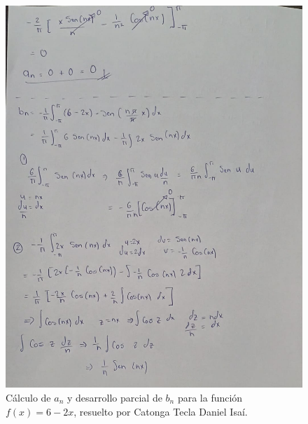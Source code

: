 {\begin{figure}[H]
    \centering
    \includegraphics[width=\linewidth]{Figures/fourierDaniel/fourierDaniel3.jpg}
    \caption[Cálculo de \(a_n\) y desarrollo de \(b_n\) para \(f(x) = 6 - 2x\)]{Cálculo de \(a_n\) y desarrollo parcial de \(b_n\) para la función \(f(x) = 6 - 2x\), resuelto por Catonga Tecla Daniel Isaí.}
    \label{fig:figure-daniel-03}
\end{figure}

}

